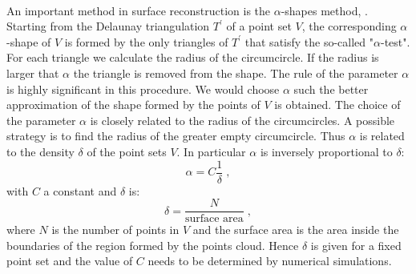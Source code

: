 \\ \indent An important method in surface reconstruction is the $\alpha$-shapes method, \cite{edelsbrunner2010alpha, guo1997surface}. Starting from the Delaunay triangulation $T^\prime$ of a point set $V$, the corresponding $\alpha$-shape of $V$ is formed by the only triangles of $T^\prime$ that satisfy the so-called "$\alpha$-test".
For each triangle we calculate the radius of the circumcircle. If the radius is larger that $\alpha$ the triangle is removed from the shape. The rule of the parameter $\alpha$ is highly significant in this procedure. We would choose $\alpha$ such the better approximation of the shape formed by the points of $V$ is obtained. 
The choice of the parameter $\alpha$ is closely related to the radius of the circumcircles. A possible strategy is to find the radius of the greater empty circumcircle. Thus $\alpha$ is related to the density $\delta$ of the point sets $V$. In particular $\alpha$ is inversely proportional to $\delta$:
\begin{equation}
\alpha=C\frac{1}{\delta}\;,
\end{equation}
with $C$ a constant and $\delta$ is:
\begin{equation}
\delta=\frac{N}{\mbox{surface area}}\; ,
\end{equation}
where $N$ is the number of points in $V$ and the surface area is the area inside the boundaries of the region formed by the points cloud. Hence $\delta$ is given for a fixed point set and the value of $C$ needs to be determined by numerical simulations.
\\
